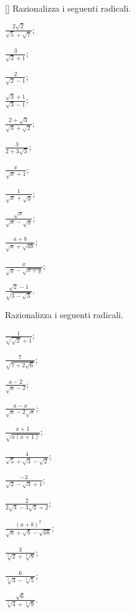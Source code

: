 \begin{esercizio}
 \label{ese:2.74}[\Ast]
Razionalizza i seguenti radicali.
 \begin{multicols}{4}
 \begin{enumeratea}
 \item $\frac{2\sqrt 2}{\sqrt 5+\sqrt 7}$;
 \item $\frac 3{\sqrt 2+1}$;
 \item $\frac 2{\sqrt 2-1}$;
 \item $\frac{\sqrt 3+1}{\sqrt 3-1}$;
 \item $\frac{2+\sqrt 3}{\sqrt 3+\sqrt 2}$;
 \item $\frac 3{2+3\sqrt 3}$;
 \item $\frac x{\sqrt x+1}$;
 \item $\frac 1{\sqrt x+\sqrt y}$;
 \item $\frac{\sqrt x}{\sqrt x-\sqrt y}$;
 \item $\frac{a+b}{\sqrt a+\sqrt{ab}}$;
 \item $\frac x{\sqrt y-\sqrt{x+y}}$;
 \item $\frac{\sqrt 2-1}{\sqrt{3-\sqrt 3}}$.
 \end{enumeratea}
 \end{multicols}
\end{esercizio}

\begin{esercizio}
 \label{ese:2.75}
Razionalizza i seguenti radicali.
 \begin{multicols}{4}
 \begin{enumeratea}
 \item $\frac 1{\sqrt{\sqrt 2}+1}$;
 \item $\frac 7{\sqrt{7+2\sqrt 6}}$;
 \item $\frac{a-2}{\sqrt a-2}$;
 \item $\frac{a-x}{\sqrt a-2\sqrt x}$;
 \item $\frac{x+1}{\sqrt{x(x+1)}}$;
 \item $\frac 4{\sqrt 5+\sqrt 3-\sqrt 2}$;
 \item $\frac{-3}{\sqrt 2-\sqrt 3+1}$;
 \item $\frac 2{2\sqrt 3-3\sqrt 2+2}$;
 \item $\frac{(a+b)^2}{\sqrt a+\sqrt b-\sqrt{ab}}$;
 \item $\frac 3{\sqrt[3]2+\sqrt[3]9}$;
 \item $\frac 6{\sqrt[3]3-\sqrt[3]5}$;
 \item $\frac{\sqrt 6}{\sqrt[3]4+\sqrt[3]9}$.
 \end{enumeratea}
 \end{multicols}
\end{esercizio}

